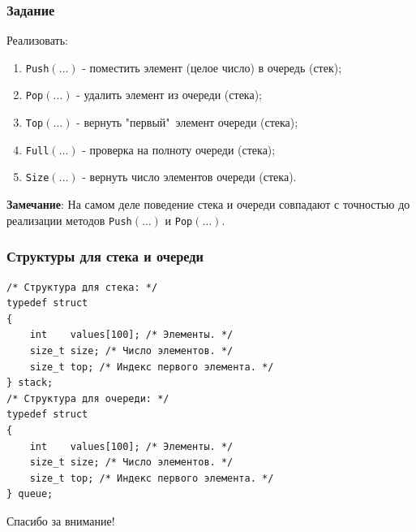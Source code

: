 \documentclass{beamer}
\begin{document}
    \begin{frame}[fragile]
        \frametitle{Задание}
        Реализовать:
        \begin{enumerate}
            \item {\tt Push}$(\dotsc)$ - поместить элемент (целое число) в очередь (стек);
            \item {\tt Pop}$(\dotsc)$ - удалить элемент из очереди (стека);
            \item {\tt Top}$(\dotsc)$ - вернуть "первый"\ элемент очереди (стека);
            \item {\tt Full}$(\dotsc)$ - проверка на полноту очереди (стека);
            \item {\tt Size}$(\dotsc)$ - вернуть число элементов очереди (стека).
        \end{enumerate}
        \vspace{0.5cm}
        \par
        \justifying
        {\bf Замечание}: На самом деле поведение стека и очереди совпадают с точностью до реализации методов  {\tt Push}$(\dotsc)$ и  {\tt Pop}$(\dotsc)$.
    \end{frame}
    \begin{frame}[fragile]
        \frametitle{Структуры для стека и очереди}
        \begin{verbatim}
/* Структура для стека: */
typedef struct
{
    int    values[100]; /* Элементы. */
    size_t size; /* Число элементов. */
    size_t top; /* Индекс первого элемента. */ 
} stack;
/* Структура для очереди: */
typedef struct
{
    int    values[100]; /* Элементы. */
    size_t size; /* Число элементов. */
    size_t top; /* Индекс первого элемента. */ 
} queue;
        \end{verbatim}
    \end{frame}
    \begin{frame}
        \begin{center}
        \baselineskip 20.0mm
        \Huge Спасибо за внимание!
        \end{center}
    \end{frame}
\end{document}
